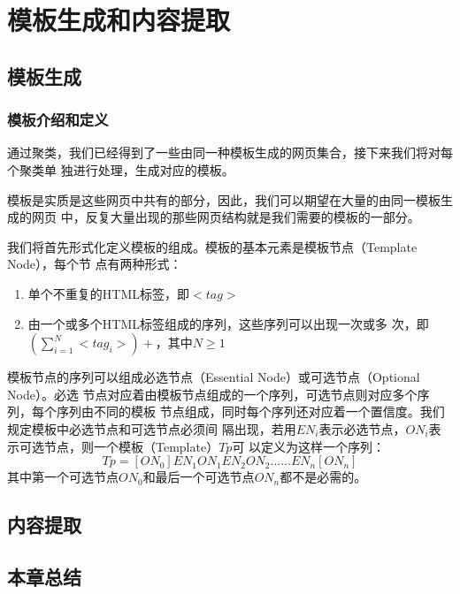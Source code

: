 
\chapter{模板生成和内容提取}
\label{chap:template}
\section{模板生成}
\label{sec:templategen}

\subsection{模板介绍和定义}
通过聚类，我们已经得到了一些由同一种模板生成的网页集合，接下来我们将对每个聚类单
独进行处理，生成对应的模板。

模板是实质是这些网页中共有的部分，因此，我们可以期望在大量的由同一模板生成的网页
中，反复大量出现的那些网页结构就是我们需要的模板的一部分。

我们将首先形式化定义模板的组成。模板的基本元素是模板节点（Template Node），每个节
点有两种形式：
\begin{enumerate}
\item 单个不重复的HTML标签，即$<tag>$
\item 由一个或多个HTML标签组成的序列，这些序列可以出现一次或多
  次，即$(\sum_{i=1}^N<tag_i>)+$，其中$N \ge 1$
\end{enumerate}

模板节点的序列可以组成必选节点（Essential Node）或可选节点（Optional Node）。必选
节点对应着由模板节点组成的一个序列，可选节点则对应多个序列，每个序列由不同的模板
节点组成，同时每个序列还对应着一个置信度。我们规定模板中必选节点和可选节点必须间
隔出现，若用$EN_i$表示必选节点，$ON_i$表示可选节点，则一个模板（Template）$Tp$可
以定义为这样一个序列：
\[
Tp=[ON_0]EN_1ON_1EN_2ON_2......EN_n[ON_n]
\]
其中第一个可选节点$ON_0$和最后一个可选节点$ON_n$都不是必需的。
\section{内容提取}
\label{sec:extraction}

\section{本章总结}
\label{sec:summarytemplate}


